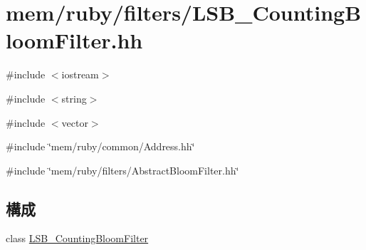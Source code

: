 \hypertarget{LSB__CountingBloomFilter_8hh}{
\section{mem/ruby/filters/LSB\_\-CountingBloomFilter.hh}
\label{LSB__CountingBloomFilter_8hh}
}
{\ttfamily \#include $<$iostream$>$}\par
{\ttfamily \#include $<$string$>$}\par
{\ttfamily \#include $<$vector$>$}\par
{\ttfamily \#include \char`\"{}mem/ruby/common/Address.hh\char`\"{}}\par
{\ttfamily \#include \char`\"{}mem/ruby/filters/AbstractBloomFilter.hh\char`\"{}}\par
\subsection*{構成}
\begin{DoxyCompactItemize}
\item 
class \hyperlink{classLSB__CountingBloomFilter}{LSB\_\-CountingBloomFilter}
\end{DoxyCompactItemize}
